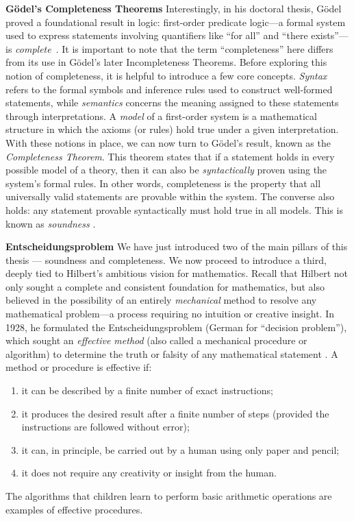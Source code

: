 \noindent \textbf{ Gödel’s Completeness Theorems} 
Interestingly, in his doctoral thesis, Gödel proved a foundational result in logic: first-order predicate logic---a formal system used to express statements involving quantifiers like ``for all'' and ``there exists''---is \emph{complete}~\cite{godelVollstandigkeitAxiomeLogischen1930}. It is important to note that the term ``completeness'' here differs from its use in Gödel’s later Incompleteness Theorems.
Before exploring this notion of completeness, it is helpful to introduce a few core concepts. \emph{Syntax} refers to the formal symbols and inference rules used to construct well-formed statements, while \emph{semantics} concerns the meaning assigned to these statements through interpretations. A \emph{model} of a first-order system is a mathematical structure in which the axioms (or rules) hold true under a given interpretation.
With these notions in place, we can now turn to Gödel’s result, known as the \emph{Completeness Theorem}. This theorem states that  if a statement holds in every possible model of a theory, then it can also be \emph{syntactically} proven using the system’s formal rules. In other words, completeness is the property that all universally valid statements are provable within the system.  The converse also holds: any statement provable syntactically must hold true in all models. This is known as \emph{soundness} \cite{franzenGodelsTheorem2008}.
 


\noindent \textbf{Entscheidungsproblem}
We have just introduced two of the main  pillars of this thesis ---
soundness and completeness. We now proceed to introduce a third,  deeply tied to Hilbert's ambitious vision for mathematics. Recall that Hilbert not only sought a complete and consistent foundation for mathematics, but also believed in the possibility of an entirely \emph{mechanical} method to resolve any mathematical problem---a process requiring no intuition or creative insight. In 1928, he formulated the Entscheidungsproblem (German for “decision problem”), which sought an \emph{effective method} (also called a mechanical procedure or algorithm)  to determine  the truth or falsity of any mathematical statement \cite{hilbert1928}.  A method or procedure is effective if:
\begin{enumerate}
    \item it can be described by a finite number of exact instructions;
    \item it produces the desired result after a finite number of steps (provided the instructions are followed without error);
    \item it can, in principle, be carried out by a human using only paper and pencil;
    \item it does not require any creativity or insight from the human.
\end{enumerate}
The algorithms that children learn to perform basic arithmetic operations are examples of effective procedures. 
   

